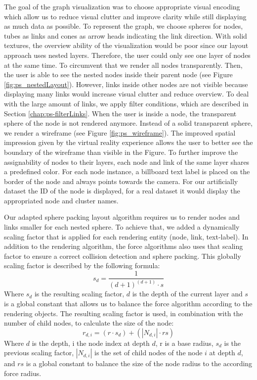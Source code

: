 The goal of the graph visualization was to choose appropriate visual encoding which allow us to reduce visual clutter and improve clarity while still displaying as much data as possible.
To represent the graph, we choose spheres for nodes, tubes as links and cones as arrow heads indicating the link direction.
With solid textures, the overview ability of the visualization would be poor since our layout approach uses nested layers. Therefore, the user could only see one layer of nodes at the same time. To circumvent that we render all nodes transparently. Then, the user is able to see the nested nodes inside their parent node (see Figure \ref{fig:ps_nestedLayout}). 
However, links inside other nodes are not visible because displaying many links would increase visual clutter and reduce overview. To deal with the large amount of links, we apply filter conditions, which are described in Section \ref{chap:ps-filterLinks}.
When the user is inside a node, the transparent sphere of the node is not rendered anymore. Instead of a solid transparent sphere, we render a wireframe (see Figure \ref{fig:ps_wireframe}). The improved spatial impression given by the virtual reality experience allows the user to better see the boundary of the wireframe than visible in the Figure. To further improve the assignability of nodes to their layers, each node and link of the same layer shares a predefined color.
For each node instance, a billboard text label is placed on the border of the node and always points towards the camera. For our artificially dataset the ID of the node is displayed, for a real dataset it would display the appropriated node and cluster names.

Our adapted sphere packing layout algorithm requires us to render nodes and links smaller for each nested sphere. To achieve that, we added a dynamically scaling factor that is applied for each rendering entity (node, link, text-label). 
In addition to the rendering algorithm, the force algorithms also uses that scaling factor to ensure a correct collision detection and sphere packing. 
This globally scaling factor is described by the following formula: 
\begin{equation}
    s_{ d } = \frac{1}{(d+1)^{(d+1)} \cdot s}
\end{equation}
Where $s_{ d }$ is the resulting scaling factor, $d$ is the depth of the current layer and $s$ is a global constant that allows us to balance the force algorithm according to the rendering objects. The resulting scaling factor is used, in combination with the number of child nodes, to calculate the size of the node: 
\begin{equation}
    r_{ d,i } = (r \cdot s_{ d }) + (\left\lvert N_{ d,i } \right\rvert \cdot rs)
\end{equation}
Where $d$ is the depth, i the node index at depth $d$, r is a base radius, $s_{ d }$ is the previous scaling factor, $\left\lvert N_{ d,i } \right\rvert$ is the set of child nodes of the node $i$ at depth $d$, and $rs$ is a global constant to balance the size of the node radius to the according force radius.


